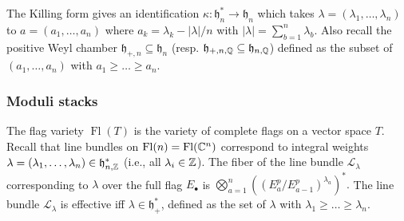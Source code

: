 \documentclass[11pt]{amsart}
\newcommand\op{\operatorname}
\newcommand\bull{{\bullet}}
\newcommand\frh{\mathfrak{h}}
\newcommand\ml{\mathcal{L}}
\numberwithin{theorem}{subsection}
\begin{document}
The Killing form gives an identification
$\kappa:\frh_n^*\to \frh_n$ which takes $\lambda=(\lambda_1,\dots,\lambda_n)$ to $a=(a_1,\dots,a_n)$ where
$a_k=\lambda_k-|\lambda|/n$ with $|\lambda|=\sum_{b=1}^n \lambda_b$. Also recall the positive Weyl chamber
$\frh_{+,n}\subseteq  \frh_{n}$ (resp. $\frh_{+,n,\Bbb{Q}}\subseteq  \frh_{n,\Bbb{Q}}$) defined as the subset of  $(a_1,\dots,a_n)$ with $a_1\ge\dots\ge a_n$.

\subsubsection{Moduli stacks}\label{loudvoice2}
The flag variety $\op{Fl}(T)$ is the variety of complete flags on a vector space $T$. Recall that line bundles on $\op{Fl}(n)=\op{Fl}(\Bbb{C}^n)$ correspond to integral weights $\lambda=(\lambda_1,\dots,\lambda_n)\in \frh_{n,\Bbb{Z}}^*$ (i.e., all $\lambda_i\in\Bbb{Z}$). The fiber of the line bundle $\ml_{\lambda}$ corresponding to $\lambda$ over the full flag $E_{\bull}$ is
$\bigotimes_{a=1}^{n} ((E^p_a/E^p_{a-1})^{\lambda_a})^*.$ The line bundle $\ml_{\lambda}$
 is effective iff $\lambda\in \frh_{+}^*$, defined as the set of $\lambda$ with $\lambda_1\ge\dots\ge \lambda_n$.
\end{document}
